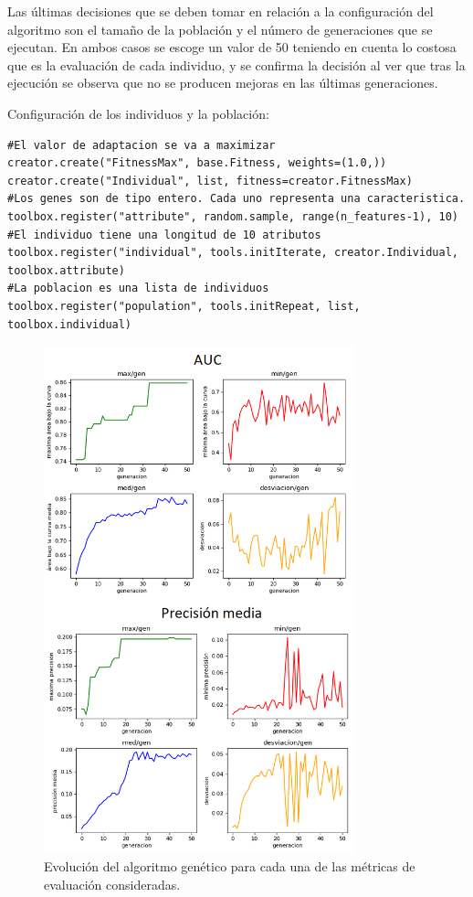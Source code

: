 Las últimas decisiones que se deben tomar en relación a la configuración del algoritmo son el tamaño de la población y el número de generaciones que se ejecutan. En ambos casos se escoge un valor de 50 teniendo en cuenta lo costosa que es la evaluación de cada individuo, y se confirma la decisión al ver que tras la ejecución se observa que no se producen mejoras en las últimas generaciones. 

Configuración de los individuos y la población: 

\begin{minipage}{0.95\linewidth} 
\begin{lstlisting}
#El valor de adaptacion se va a maximizar
creator.create("FitnessMax", base.Fitness, weights=(1.0,))
creator.create("Individual", list, fitness=creator.FitnessMax)
#Los genes son de tipo entero. Cada uno representa una caracteristica. 
toolbox.register("attribute", random.sample, range(n_features-1), 10) 
#El individuo tiene una longitud de 10 atributos 
toolbox.register("individual", tools.initIterate, creator.Individual, toolbox.attribute)
#La poblacion es una lista de individuos 
toolbox.register("population", tools.initRepeat, list, toolbox.individual)
\end{lstlisting}
\end{minipage}


\begin{figure}
	\centering
	\includegraphics[width=0.8\textwidth]{../img/genetico.png}
	\caption{Evolución del algoritmo genético para cada una de las métricas de evaluación consideradas.}
	\label{fig:genetico}
\end{figure}

